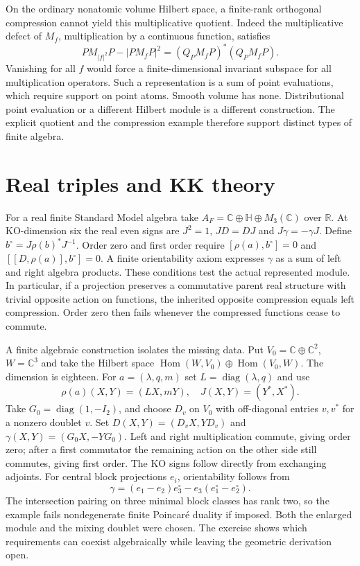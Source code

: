 \documentclass[11pt,oneside]{article}
\newcommand{\C}{\mathbb C}
\newcommand{\R}{\mathbb R}
\newcommand{\HH}{\mathbb H}
\begin{document}
On the ordinary nonatomic volume Hilbert space, a finite-rank orthogonal compression cannot yield this multiplicative quotient. Indeed the multiplicative defect of \(M_f\), multiplication by a continuous function, satisfies
\[
 PM_{|f|^2}P-|PM_fP|^2=(Q_PM_fP)^*(Q_PM_fP).
\]
Vanishing for all \(f\) would force a finite-dimensional invariant subspace for all multiplication operators. Such a representation is a sum of point evaluations, which require support on point atoms. Smooth volume has none. Distributional point evaluation or a different Hilbert module is a different construction. The explicit quotient and the compression example therefore support distinct types of finite algebra.

\section{Real triples and KK theory}
For a real finite Standard Model algebra take \(A_F=\C\oplus\HH\oplus M_3(\C)\) over \(\R\). At KO-dimension six the real even signs are \(J^2=1\), \(JD=DJ\) and \(J\gamma=-\gamma J\). Define \(b^\circ=J\rho(b)^*J^{-1}\). Order zero and first order require \([\rho(a),b^\circ]=0\) and \([[D,\rho(a)],b^\circ]=0\). A finite orientability axiom expresses \(\gamma\) as a sum of left and right algebra products. These conditions test the actual represented module. In particular, if a projection preserves a commutative parent real structure with trivial opposite action on functions, the inherited opposite compression equals left compression. Order zero then fails whenever the compressed functions cease to commute.

A finite algebraic construction isolates the missing data. Put \(V_0=\C\oplus\C^2\), \(W=\C^3\) and take the Hilbert space \(\operatorname{Hom}(W,V_0)\oplus\operatorname{Hom}(V_0,W)\). The dimension is eighteen. For \(a=(\lambda,q,m)\) set \(L=\operatorname{diag}(\lambda,q)\) and use
\[
 \rho(a)(X,Y)=(LX,mY),\quad J(X,Y)=(Y^*,X^*).
\]
Take \(G_0=\operatorname{diag}(1,-I_2)\), and choose \(D_v\) on \(V_0\) with off-diagonal entries \(v,v^*\) for a nonzero doublet \(v\). Set \(D(X,Y)=(D_vX,YD_v)\) and \(\gamma(X,Y)=(G_0X,-YG_0)\). Left and right multiplication commute, giving order zero; after a first commutator the remaining action on the other side still commutes, giving first order. The KO signs follow directly from exchanging adjoints. For central block projections \(e_i\), orientability follows from
\[
 \gamma=(e_1-e_2)e_3^\circ-e_3(e_1^\circ-e_2^\circ).
\]
The intersection pairing on three minimal block classes has rank two, so the example fails nondegenerate finite Poincar\'e duality if imposed. Both the enlarged module and the mixing doublet were chosen. The exercise shows which requirements can coexist algebraically while leaving the geometric derivation open.
\end{document}
